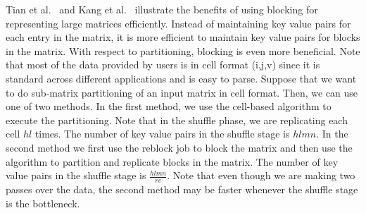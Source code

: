 \documentclass{vldb}
\newcommand{\topicnoul}[1]{\par \smallskip \smallskip \noindent{\bf {#1}}}
\begin{document}
\topicnoul{Submatrix-partitioning:}
Tian et al.~\cite{DBLP:conf/icde/TianK11} and Kang et al.~\cite{DBLP:conf/icdm/KangTF09} illustrate
the benefits of using blocking for representing large matrices efficiently.
Instead of maintaining key value pairs for each entry in the matrix, it is more
efficient to maintain key value pairs for blocks in the matrix. With respect to
partitioning, blocking is even more beneficial. Note that most of the data
provided by users is in cell format (i,j,v) since it is standard across
different applications and is easy to parse.
Suppose that we want to do
sub-matrix partitioning of an input matrix in cell format. Then, we can use one
of two methods. In the first method, we use the cell-based algorithm to execute
the partitioning. Note that in the shuffle phase, we are replicating each cell
$hl$ times. The number of key value pairs in the shuffle stage is $hlmn$. In the
second method we first use the reblock job to block the matrix and then use the
algorithm to partition and replicate blocks in the matrix. The number of key
value pairs in the shuffle stage is $\frac{hlmn}{rc}$. Note that even though we
are making two passes over the data, the second method may be faster whenever
the shuffle stage is the bottleneck.
\end{document}
